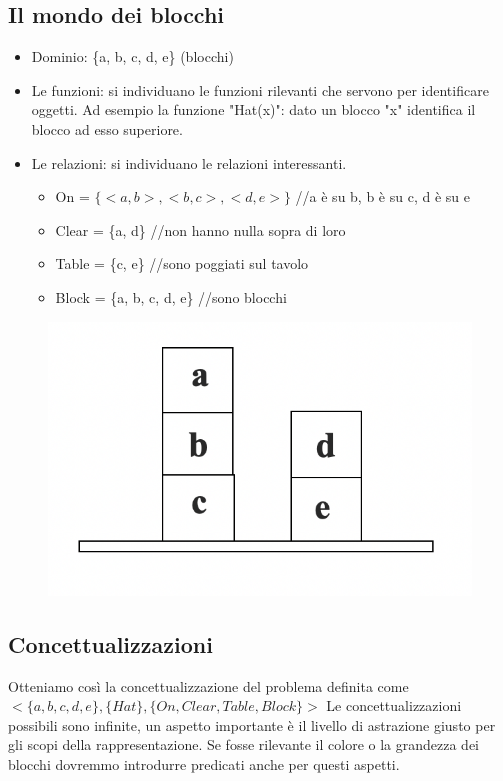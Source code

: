 \documentclass{article}
\begin{document}
\subsection{Il mondo dei blocchi}
\begin{itemize}
    \item Dominio: \{a, b, c, d, e\} (blocchi)
    \item Le funzioni: si individuano le funzioni rilevanti che servono per identificare oggetti. Ad esempio la funzione "Hat(x)": dato un blocco "x" identifica il blocco ad esso superiore.
    \item Le relazioni: si individuano le relazioni interessanti. 
        \begin{itemize}
            \item On = $\{<a, b>, <b, c>, <d, e>\}$ //a è su b, b è su c, d è su e
            \item Clear = \{a, d\} //non hanno nulla sopra di loro
            \item Table = \{c, e\} //sono poggiati sul tavolo
            \item Block = \{a, b, c, d, e\} //sono blocchi
    \end{itemize} 
\end{itemize}
\begin{figure}[H]
\centering
\includegraphics[scale=0.5]{Images/blocks.png}
\end{figure}

\subsection{Concettualizzazioni}
Otteniamo così la concettualizzazione del problema definita come \newline 
$<\{a, b, c, d, e\}, \{Hat\}, \{On, Clear, Table, Block\}>$ \newline
Le concettualizzazioni possibili sono infinite, un aspetto importante è il livello di astrazione giusto per gli scopi della rappresentazione. Se fosse rilevante il colore o la grandezza dei blocchi dovremmo introdurre predicati anche per questi aspetti.
\end{document}
